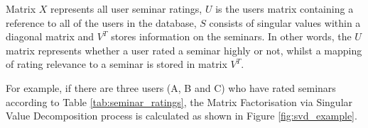 \documentclass{l4proj}
\begin{document}
Matrix $X$ represents all user seminar ratings, $U$ is the users matrix containing a reference to all of the users in the database, $S$ consists of singular values within a diagonal matrix and $V^T$  stores information on the seminars. In other words, the $U$ matrix represents whether a user rated a seminar highly or not, whilst a mapping of rating relevance to a seminar is stored in matrix $V^T.$

\begin{table}[htb]
    \centering
    \caption{Example seminar ratings if there were three users and five seminars where five is the best possible rating that could be given. A rating of zero indicates that the user has not given that seminar a rating.}
    \label{tab:seminar_ratings}
\end{table}

For example, if there are three users (A, B and C) who have rated seminars according to Table \ref{tab:seminar_ratings}, the Matrix Factorisation via Singular Value Decomposition process is calculated as shown in Figure \ref{fig:svd_example}.
\end{document}
